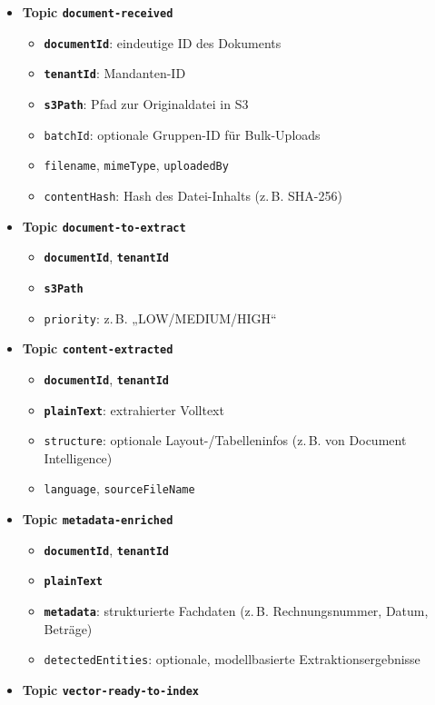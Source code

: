 \begin{itemize}
\tightlist
\item
  \textbf{Topic \texttt{document-received}}

  \begin{itemize}
  \tightlist
  \item
    \textbf{\texttt{documentId}}: eindeutige ID des Dokuments
  \item
    \textbf{\texttt{tenantId}}: Mandanten-ID
  \item
    \textbf{\texttt{s3Path}}: Pfad zur Originaldatei in S3
  \item
    \texttt{batchId}: optionale Gruppen-ID für Bulk-Uploads
  \item
    \texttt{filename}, \texttt{mimeType}, \texttt{uploadedBy}
  \item
    \texttt{contentHash}: Hash des Datei-Inhalts (z.\,B. SHA-256)
  \end{itemize}
\item
  \textbf{Topic \texttt{document-to-extract}}

  \begin{itemize}
  \tightlist
  \item
    \textbf{\texttt{documentId}}, \textbf{\texttt{tenantId}}
  \item
    \textbf{\texttt{s3Path}}
  \item
    \texttt{priority}: z.\,B. „LOW/MEDIUM/HIGH``
  \end{itemize}
\item
  \textbf{Topic \texttt{content-extracted}}

  \begin{itemize}
  \tightlist
  \item
    \textbf{\texttt{documentId}}, \textbf{\texttt{tenantId}}
  \item
    \textbf{\texttt{plainText}}: extrahierter Volltext
  \item
    \texttt{structure}: optionale Layout-/Tabelleninfos (z.\,B. von
    Document Intelligence)
  \item
    \texttt{language}, \texttt{sourceFileName}
  \end{itemize}
\item
  \textbf{Topic \texttt{metadata-enriched}}

  \begin{itemize}
  \tightlist
  \item
    \textbf{\texttt{documentId}}, \textbf{\texttt{tenantId}}
  \item
    \textbf{\texttt{plainText}}
  \item
    \textbf{\texttt{metadata}}: strukturierte Fachdaten (z.\,B.
    Rechnungsnummer, Datum, Beträge)
  \item
    \texttt{detectedEntities}: optionale, modellbasierte
    Extraktionsergebnisse
  \end{itemize}
\item
  \textbf{Topic \texttt{vector-ready-to-index}}


\end{itemize}
